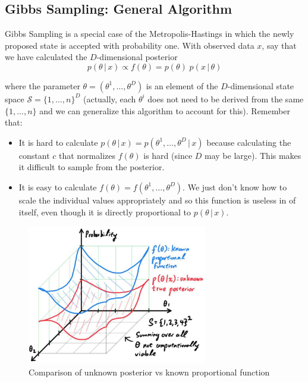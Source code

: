 \documentclass{article}
\begin{document}
\subsection{Gibbs Sampling: General Algorithm}

  Gibbs Sampling is a special case of the Metropolis-Hastings in which the newly proposed state is accepted with probability one. With observed data $x$, say that we have calculated the $D$-dimensional posterior
  \begin{equation}
    p(\theta\,|\,x) \propto f(\theta) = p(\theta) \; p(x\,|\, \theta)
  \end{equation}

  where the parameter $\theta = (\theta^1, \ldots, \theta^D)$ is an element of the $D$-dimensional state space $\mathcal{S} = \{1, \ldots, n\}^D$ (actually, each $\theta^i$ does not need to be derived from the same $\{1, \ldots, n\}$ and we can generalize this algorithm to account for this). Remember that:
  \begin{itemize}
    \item It is hard to calculate $p(\theta\,|\,x) = p(\theta^1, \ldots, \theta^D\,|\,x)$ because calculating the constant $c$ that normalizes $f(\theta)$ is hard (since $D$ may be large). This makes it difficult to sample from the posterior.
    \item It is easy to calculate $f(\theta) = f(\theta^1, \ldots, \theta^D)$. We just don't know how to scale the individual values appropriately and so this function is useless in of itself, even though it is directly proportional to $p(\theta\,|\,x)$.
  \end{itemize}

  \begin{figure}[H]
    \centering
    \includegraphics[width=0.7\textwidth]{img/unknown_posterior_vs_known_f.jpg}
    \caption{Comparison of unknown posterior vs known proportional function}
  \end{figure}
\end{document}
